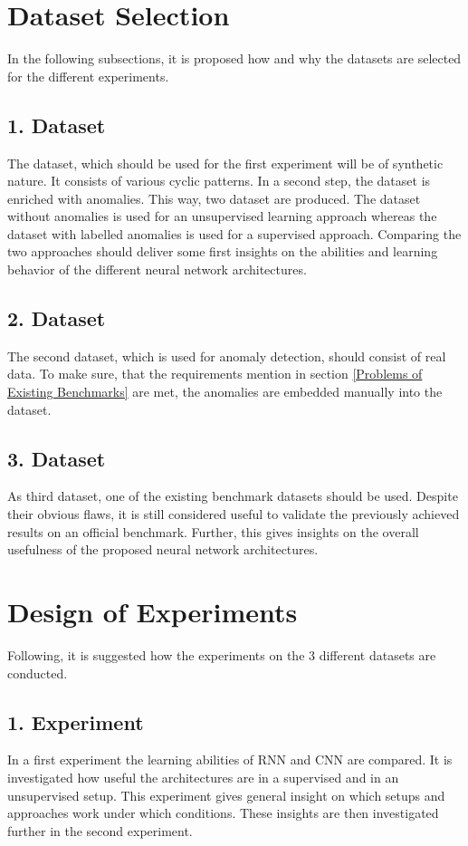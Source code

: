 \section{Dataset Selection}
In the following subsections, it is proposed how and why the datasets are selected for the different experiments.

\subsection{1. Dataset}
The dataset, which should be used for the first experiment will be of synthetic nature. It consists of various cyclic patterns. In a second step, the dataset is enriched with anomalies. This way, two dataset are produced. The dataset without anomalies is used for an unsupervised learning approach whereas the dataset with labelled anomalies is used for a supervised approach. Comparing the two approaches should deliver some first insights on the abilities and learning behavior of the different neural network architectures.   

\subsection{2. Dataset}
The second dataset, which is used for anomaly detection, should consist of real data. To make sure, that the requirements mention in section \ref{Problems of Existing Benchmarks} are met, the anomalies are embedded manually into the dataset. 

\subsection{3. Dataset}
As third dataset, one of the existing benchmark datasets should be used. Despite their obvious flaws, it is still considered useful to validate the previously achieved results on an official benchmark. Further, this gives insights on the overall usefulness of the proposed neural network architectures.

\section{Design of Experiments}
Following, it is suggested how the experiments on the 3 different datasets are conducted.

\subsection{1. Experiment}
In a first experiment the learning abilities of RNN and CNN are compared. It is investigated how useful the architectures are in a supervised and in an unsupervised setup. This experiment gives general insight on which setups and approaches work under which conditions. These insights are then investigated further in the second experiment.

